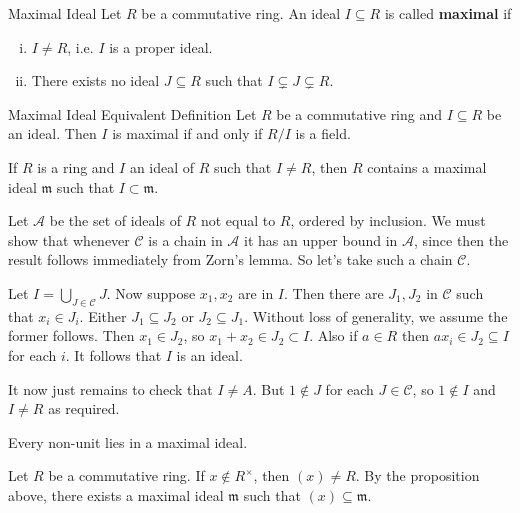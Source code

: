 \begin{definition}{Maximal Ideal}{}
    Let $R$ be a commutative ring. An ideal $I\subseteq R$ is called \textbf{maximal} if
    \begin{enumerate}[(i)]
        \item $I\ne R$, i.e. $I$ is a proper ideal.
        \item There exists no ideal $J\subseteq R$ such that $I\subsetneq J\subsetneq R$.
    \end{enumerate}
\end{definition}

\begin{proposition}{Maximal Ideal Equivalent Definition}{}
    Let $R$ be a commutative ring and $I\subseteq R$ be an ideal. Then $I$ is maximal if and only if $R/I$ is a field.  
\end{proposition}

\begin{proposition}{}{}
    If $R$ is a ring and $I$ an ideal of $R$ such that $I \neq R$, then $R$ contains a maximal ideal $\mathfrak{m}$ such that $I \subset \mathfrak{m}$.
\end{proposition}

\begin{prf}
    Let $\mathcal{A}$ be the set of ideals of $R$ not equal to $R$, ordered by inclusion. We must show that whenever $\mathcal{C}$ is a chain in $\mathcal{A}$ it has an upper bound in $\mathcal{A}$, since then the result follows immediately from Zorn's lemma. So let's take such a chain $\mathcal{C}$.

Let $I=\bigcup_{J \in \mathcal{C}} J$. Now suppose $x_1, x_2$ are in $I$. Then there are $J_1, J_2$ in $\mathcal{C}$ such that $x_i \in J_i$. Either $J_1 \subseteq J_2$ or $J_2 \subseteq J_1$. Without loss of generality, we assume the former follows. Then $x_1 \in J_2$, so $x_1+x_2 \in J_2 \subset I$. Also if $a \in R$ then $a x_i \in J_2 \subseteq I$ for each $i$. It follows that $I$ is an ideal.

It now just remains to check that $I \neq A$. But $1 \notin J$ for each $J \in \mathcal{C}$, so $1 \notin I$ and $I \neq R$ as required.
\end{prf}

\begin{corollary}{}{}
    Every non-unit lies in a maximal ideal.
\end{corollary}

\begin{prf}
    Let $R$ be a commutative ring. If $x\notin R^{\times}$, then $(x)\ne R$. By the proposition above, there exists a maximal ideal $\mathfrak{m}$ such that $(x)\subseteq \mathfrak{m}$.
\end{prf}

